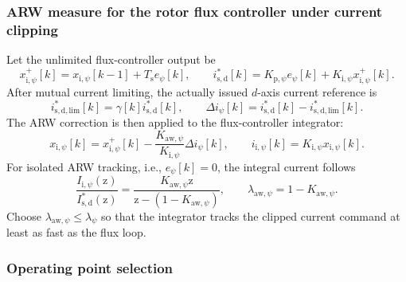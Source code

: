 \begin{frame}
    \frametitle{ARW measure for the rotor flux controller under current clipping}
    Let the unlimited flux-controller output be
    \begin{equation}
        x_{\mathrm{i},\psi}^{+}[k]=x_{\mathrm{i},\psi}[k-1]+T_\mathrm{s}e_\psi[k],
        \qquad
        i^{*}_{\mathrm{s,d}}[k]
        =K_{\mathrm{p},\psi}e_\psi[k]+K_{\mathrm{i},\psi}x_{\mathrm{i},\psi}^{+}[k].
        \label{eq:IM_flux_unlimited_PI_output}
    \end{equation}\pause%
    After mutual current limiting, the actually issued $d$-axis current reference is
    \begin{equation}
        i^{*}_{\mathrm{s,d,lim}}[k]=\gamma[k]i^{*}_{\mathrm{s,d}}[k],
        \qquad
        \Delta i_\psi[k]=i^{*}_{\mathrm{s,d}}[k]-i^{*}_{\mathrm{s,d,lim}}[k].
        \label{eq:IM_flux_current_clipping_mismatch}
    \end{equation}\pause%
    The ARW correction is then applied to the flux-controller integrator:
    \begin{equation}
        x_{\mathrm{i},\psi}[k]
        =x_{\mathrm{i},\psi}^{+}[k]-\frac{K_{\mathrm{aw},\psi}}{K_{\mathrm{i},\psi}}\Delta i_\psi[k],
        \qquad
        i_{\mathrm{i},\psi}[k]=K_{\mathrm{i},\psi}x_{\mathrm{i},\psi}[k].
        \label{eq:IM_flux_ARW_state_update}
    \end{equation}\pause%
    For isolated ARW tracking, i.e., $e_\psi[k]=0$, the integral current follows
    \begin{equation}
        \frac{I_{\mathrm{i},\psi}(\mathrm{z})}{I^{*}_{\mathrm{s,d}}(\mathrm{z})}
        =\frac{K_{\mathrm{aw},\psi}\mathrm{z}}{\mathrm{z}-(1-K_{\mathrm{aw},\psi})},
        \qquad
        \lambda_{\mathrm{aw},\psi}=1-K_{\mathrm{aw},\psi} .
    \end{equation}
    Choose $\lambda_{\mathrm{aw},\psi}\leq\lambda_\psi$ so that the integrator tracks the clipped current command at least as fast as the flux loop.
\end{frame}

\subsubsection{Operating point selection}


